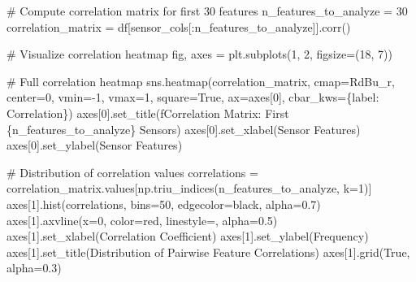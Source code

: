 \documentclass[
  letterpaper,
  DIV=11,
  numbers=noendperiod]{scrartcl}
\newenvironment{Shaded}{\begin{snugshade}}{\end{snugshade}}
\newcommand{\CommentTok}[1]{\textcolor[rgb]{0.37,0.37,0.37}{#1}}
\newcommand{\DecValTok}[1]{\textcolor[rgb]{0.68,0.00,0.00}{#1}}
\newcommand{\FloatTok}[1]{\textcolor[rgb]{0.68,0.00,0.00}{#1}}
\newcommand{\NormalTok}[1]{\textcolor[rgb]{0.00,0.23,0.31}{#1}}
\newcommand{\OperatorTok}[1]{\textcolor[rgb]{0.37,0.37,0.37}{#1}}
\newcommand{\SpecialCharTok}[1]{\textcolor[rgb]{0.37,0.37,0.37}{#1}}
\newcommand{\SpecialStringTok}[1]{\textcolor[rgb]{0.13,0.47,0.30}{#1}}
\newcommand{\StringTok}[1]{\textcolor[rgb]{0.13,0.47,0.30}{#1}}
\newcommand{\VariableTok}[1]{\textcolor[rgb]{0.07,0.07,0.07}{#1}}
\renewenvironment{Shaded}{%
  \begin{tcolorbox}[%
    enhanced,%
    colback=codebg,%
    colframe=codebg,%
    borderline west={3pt}{0pt}{sectionblue},%
    fontupper=\small\ttfamily,%
    boxrule=0pt,%
    arc=0pt,%
    boxsep=5pt,%
    left=2mm,%
    right=2mm,%
    top=2mm,%
    bottom=2mm%
  ]%
}{%
  \end{tcolorbox}%
}
\begin{document}
\begin{Shaded}
\begin{Highlighting}[]
\CommentTok{\# Compute correlation matrix for first 30 features}
\NormalTok{n\_features\_to\_analyze }\OperatorTok{=} \DecValTok{30}
\NormalTok{correlation\_matrix }\OperatorTok{=}\NormalTok{ df[sensor\_cols[:n\_features\_to\_analyze]].corr()}

\CommentTok{\# Visualize correlation heatmap}
\NormalTok{fig, axes }\OperatorTok{=}\NormalTok{ plt.subplots(}\DecValTok{1}\NormalTok{, }\DecValTok{2}\NormalTok{, figsize}\OperatorTok{=}\NormalTok{(}\DecValTok{18}\NormalTok{, }\DecValTok{7}\NormalTok{))}

\CommentTok{\# Full correlation heatmap}
\NormalTok{sns.heatmap(correlation\_matrix, cmap}\OperatorTok{=}\StringTok{\textquotesingle{}RdBu\_r\textquotesingle{}}\NormalTok{, center}\OperatorTok{=}\DecValTok{0}\NormalTok{, vmin}\OperatorTok{={-}}\DecValTok{1}\NormalTok{, vmax}\OperatorTok{=}\DecValTok{1}\NormalTok{,}
\NormalTok{            square}\OperatorTok{=}\VariableTok{True}\NormalTok{, ax}\OperatorTok{=}\NormalTok{axes[}\DecValTok{0}\NormalTok{], cbar\_kws}\OperatorTok{=}\NormalTok{\{}\StringTok{\textquotesingle{}label\textquotesingle{}}\NormalTok{: }\StringTok{\textquotesingle{}Correlation\textquotesingle{}}\NormalTok{\})}
\NormalTok{axes[}\DecValTok{0}\NormalTok{].set\_title(}\SpecialStringTok{f\textquotesingle{}Correlation Matrix: First }\SpecialCharTok{\{}\NormalTok{n\_features\_to\_analyze}\SpecialCharTok{\}}\SpecialStringTok{ Sensors\textquotesingle{}}\NormalTok{)}
\NormalTok{axes[}\DecValTok{0}\NormalTok{].set\_xlabel(}\StringTok{\textquotesingle{}Sensor Features\textquotesingle{}}\NormalTok{)}
\NormalTok{axes[}\DecValTok{0}\NormalTok{].set\_ylabel(}\StringTok{\textquotesingle{}Sensor Features\textquotesingle{}}\NormalTok{)}

\CommentTok{\# Distribution of correlation values}
\NormalTok{correlations }\OperatorTok{=}\NormalTok{ correlation\_matrix.values[np.triu\_indices(n\_features\_to\_analyze, k}\OperatorTok{=}\DecValTok{1}\NormalTok{)]}
\NormalTok{axes[}\DecValTok{1}\NormalTok{].hist(correlations, bins}\OperatorTok{=}\DecValTok{50}\NormalTok{, edgecolor}\OperatorTok{=}\StringTok{\textquotesingle{}black\textquotesingle{}}\NormalTok{, alpha}\OperatorTok{=}\FloatTok{0.7}\NormalTok{)}
\NormalTok{axes[}\DecValTok{1}\NormalTok{].axvline(x}\OperatorTok{=}\DecValTok{0}\NormalTok{, color}\OperatorTok{=}\StringTok{\textquotesingle{}red\textquotesingle{}}\NormalTok{, linestyle}\OperatorTok{=}\StringTok{\textquotesingle{}{-}{-}\textquotesingle{}}\NormalTok{, alpha}\OperatorTok{=}\FloatTok{0.5}\NormalTok{)}
\NormalTok{axes[}\DecValTok{1}\NormalTok{].set\_xlabel(}\StringTok{\textquotesingle{}Correlation Coefficient\textquotesingle{}}\NormalTok{)}
\NormalTok{axes[}\DecValTok{1}\NormalTok{].set\_ylabel(}\StringTok{\textquotesingle{}Frequency\textquotesingle{}}\NormalTok{)}
\NormalTok{axes[}\DecValTok{1}\NormalTok{].set\_title(}\StringTok{\textquotesingle{}Distribution of Pairwise Feature Correlations\textquotesingle{}}\NormalTok{)}
\NormalTok{axes[}\DecValTok{1}\NormalTok{].grid(}\VariableTok{True}\NormalTok{, alpha}\OperatorTok{=}\FloatTok{0.3}\NormalTok{)}


\end{Highlighting}
\end{Shaded}
\end{document}
